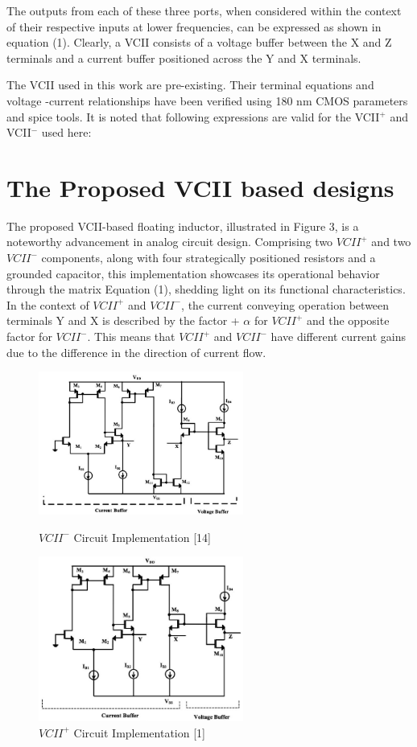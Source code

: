 \documentclass{./styles/svproc}
\begin{document}
The outputs from each of these three ports, when considered within the context of their 
respective inputs at lower frequencies, can be expressed as shown in equation (1). 
Clearly, a VCII consists of a voltage buffer between the X and Z terminals and a current 
buffer positioned across the Y and X terminals.

The  VCII used in this work are pre-existing. Their terminal equations and voltage -current relationships have been verified using 180 nm CMOS parameters and spice tools. It is noted that following expressions are valid for the VCII$^+$ and VCII$^-$ used here:
%
\section{The Proposed VCII based designs}
The proposed VCII-based floating inductor, illustrated in Figure 3, is a noteworthy advancement in analog circuit design. Comprising two $VCII^+$ and two $VCII^-$ components, along with four strategically positioned resistors and a grounded capacitor, this implementation showcases its operational behavior through the matrix Equation (1), shedding light on its functional characteristics.
 In the context of $VCII^+$ and $VCII^-$, the current conveying operation between terminals Y and X is described by the factor + $\alpha$ for $VCII^+$ and the opposite factor for $VCII^-$. This means that $VCII^+$ and $VCII^-$ have different current gains due to the difference in the direction of current flow.
\begin{figure}[h]
\begin{center}
    \includegraphics[width=0.6\textwidth]{CC2(2).jpg}
    \caption{$VCII^-$ Circuit Implementation [14]}
    \vspace{0.5cm}
    \includegraphics[width=0.6\textwidth]{CC2(1).jpg}
    \caption{$VCII^+$ Circuit Implementation [1]}
  \end{center}
\end{figure}
\end{document}
